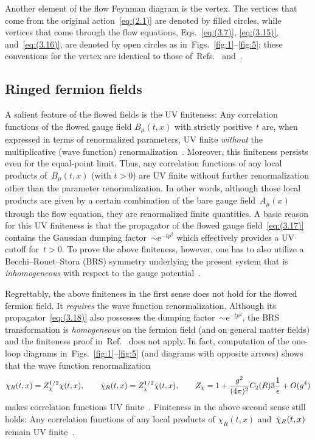 Another element of the flow Feynman diagram is the vertex. The vertices that
come from the original action~\eqref{eq:(2.1)} are denoted by filled circles,
while vertices that come through the flow equations, Eqs.~\eqref{eq:(3.7)},
\eqref{eq:(3.15)}, and~\eqref{eq:(3.16)}, are denoted by open circles as
in~Figs.~\ref{fig:1}--\ref{fig:5}; these conventions for the vertex are
identical to those of~Refs.~\cite{Suzuki:2013gza} and~\cite{Luscher:2011bx}.

\subsection{Ringed fermion fields}
A salient feature of the flowed fields is the UV finiteness: Any correlation
functions of the flowed gauge field $B_\mu(t,x)$ with strictly positive~$t$
are, when expressed in terms of renormalized parameters, UV finite
\emph{without\/} the multiplicative (wave function)
renormalization~\cite{Luscher:2011bx}. Moreover, this finiteness persists even
for the equal-point limit. Thus, any correlation functions of any local
products of~$B_\mu(t,x)$ (with $t>0$) are UV finite without further
renormalization other than the parameter renormalization. In other words,
although those local products are given by a certain combination of the bare
gauge field~$A_\mu(x)$ through the flow equation, they are renormalized finite
quantities. A basic reason for this UV finiteness is that the propagator of the
flowed gauge field~\eqref{eq:(3.17)} contains the Gaussian dumping
factor~$\sim \mathrm{e}^{-tp^2}$ which effectively provides a UV cutoff for~$t>0$. To
prove the above finiteness, however, one has to also utilize a
Becchi--Rouet--Stora (BRS) symmetry underlying the present system that is
\emph{inhomogeneous\/} with respect to the gauge
potential~\cite{Luscher:2011bx}.

Regrettably, the above finiteness in the first sense does not hold for the
flowed fermion field. It \emph{requires\/} the wave function renormalization.
Although its propagator~\eqref{eq:(3.18)} also possesses the dumping
factor~$\sim \mathrm{e}^{-tp^2}$, the BRS transformation is \emph{homogeneous\/} on the
fermion field (and on general matter fields) and the finiteness proof
in~Ref.~\cite{Luscher:2011bx} does not apply. In fact, computation of the
one-loop diagrams in~Figs.~\ref{fig:1}--\ref{fig:5} (and diagrams with opposite
arrows) shows that the wave function renormalization
\begin{equation}
   \chi_R(t,x)=Z_\chi^{1/2}\chi(t,x),\qquad
   \Bar{\chi}_R(t,x)=Z_\chi^{1/2}\Bar{\chi}(t,x),\qquad
   Z_\chi=1+\frac{g^2}{(4\pi)^2}C_2(R)3\frac{1}{\epsilon}+O(g^4)
\label{eq:(3.19)}
\end{equation}
makes correlation functions UV finite~\cite{Luscher:2013cpa}. Finiteness in the
above second sense still holds: Any correlation functions of any
local products of $\chi_R(t,x)$ and~$\Bar{\chi}_R(t,x)$ remain UV
finite~\cite{Luscher:2013cpa}.

